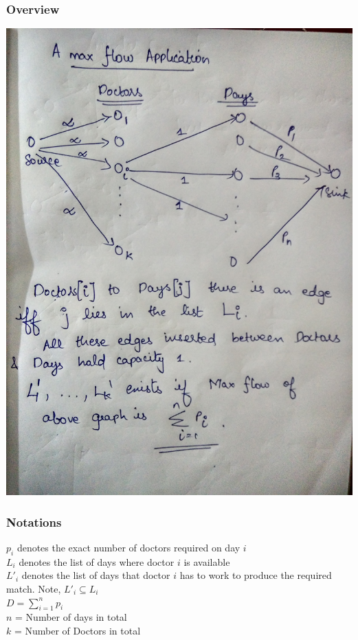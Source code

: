 \documentclass{article}
\begin{document}
\subsubsection{Overview}
\includegraphics[scale=0.15]{3a.jpg}
\subsubsection{Notations}
$p_i$ denotes the exact number of doctors required on day $i$ \\
$L_i$ denotes the list of days where doctor $i$ is available \\
$L'_i$ denotes the list of days that doctor $i$ has to work to produce the required match. Note, $L'_i \subseteq L_i$\\
$D = \sum_{i=1}^{n} p_i$ \\
$n$ = Number of days in total \\
$k$ = Number of Doctors in total \\ 
\end{document}

